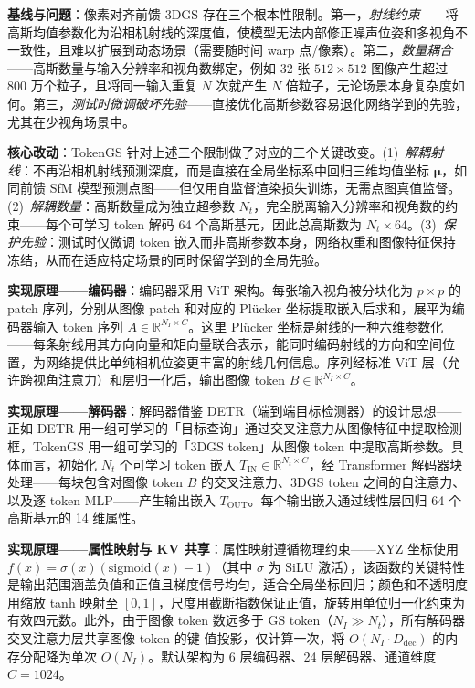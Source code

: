 \textbf{基线与问题}：像素对齐前馈 3DGS 存在三个根本性限制。第一，\emph{射线约束}——将高斯均值参数化为沿相机射线的深度值，使模型无法内部修正噪声位姿和多视角不一致性，且难以扩展到动态场景（需要随时间 warp 点/像素）。第二，\emph{数量耦合}——高斯数量与输入分辨率和视角数绑定，例如 32 张 $512 \times 512$ 图像产生超过 800 万个粒子，且将同一输入重复 $N$ 次就产生 $N$ 倍粒子，无论场景本身复杂度如何。第三，\emph{测试时微调破坏先验}——直接优化高斯参数容易退化网络学到的先验，尤其在少视角场景中。

\textbf{核心改动}：TokenGS 针对上述三个限制做了对应的三个关键改变。(1)~\emph{解耦射线}：不再沿相机射线预测深度，而是直接在全局坐标系中回归三维均值坐标 $\boldsymbol{\mu}$，如同前馈 SfM 模型预测点图——但仅用自监督渲染损失训练，无需点图真值监督。(2)~\emph{解耦数量}：高斯数量成为独立超参数 $N_t$，完全脱离输入分辨率和视角数的约束——每个可学习 token 解码 64 个高斯基元，因此总高斯数为 $N_t \times 64$。(3)~\emph{保护先验}：测试时仅微调 token 嵌入而非高斯参数本身，网络权重和图像特征保持冻结，从而在适应特定场景的同时保留学到的全局先验。

\textbf{实现原理——编码器}：编码器采用 ViT 架构。每张输入视角被分块化为 $p \times p$ 的 patch 序列，分别从图像 patch 和对应的 Pl\"ucker 坐标提取嵌入后求和，展平为编码器输入 token 序列 $A \in \mathbb{R}^{N_I \times C}$。这里 Pl\"ucker 坐标是射线的一种六维参数化——每条射线用其方向向量和矩向量联合表示，能同时编码射线的方向和空间位置，为网络提供比单纯相机位姿更丰富的射线几何信息。序列经标准 ViT 层（允许跨视角注意力）和层归一化后，输出图像 token $B \in \mathbb{R}^{N_I \times C}$。

\textbf{实现原理——解码器}：解码器借鉴 DETR（端到端目标检测器）的设计思想——正如 DETR 用一组可学习的「目标查询」通过交叉注意力从图像特征中提取检测框，TokenGS 用一组可学习的「3DGS token」从图像 token 中提取高斯参数。具体而言，初始化 $N_t$ 个可学习 token 嵌入 $T_{\text{IN}} \in \mathbb{R}^{N_t \times C}$，经 Transformer 解码器块处理——每块包含对图像 token $B$ 的交叉注意力、3DGS token 之间的自注意力、以及逐 token MLP——产生输出嵌入 $T_{\text{OUT}}$。每个输出嵌入通过线性层回归 64 个高斯基元的 14 维属性。

\textbf{实现原理——属性映射与 KV 共享}：属性映射遵循物理约束——XYZ 坐标使用 $f(x) = \sigma(x)(\text{sigmoid}(x) - 1)$（其中 $\sigma$ 为 SiLU 激活），该函数的关键特性是输出范围涵盖负值和正值且梯度信号均匀，适合全局坐标回归；颜色和不透明度用缩放 tanh 映射至 $[0,1]$，尺度用截断指数保证正值，旋转用单位归一化约束为有效四元数。此外，由于图像 token 数远多于 GS token（$N_I \gg N_t$），所有解码器交叉注意力层共享图像 token 的键-值投影，仅计算一次，将 $O(N_I \cdot D_{\text{dec}})$ 的内存分配降为单次 $O(N_I)$。默认架构为 6 层编码器、24 层解码器、通道维度 $C = 1024$。

